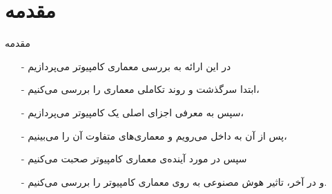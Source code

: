 \section{مقدمه}
\begin{frame}{مقدمه}
\begin{itemize}\itemr
\item[-]
در این ارائه به بررسی معماری کامپیوتر می‌پردازیم
\item[-]
ابتدا سرگذشت و روند تکاملی معماری را بررسی می‌کنیم،
\item[-]
سپس به معرفی اجزای اصلی یک کامپیوتر می‌پردازیم،
\item[-]
پس از آن به داخل  می‌رویم و معماری‌های متفاوت آن را می‌بینیم،
\item[-]
سپس در مورد آینده‌ی معماری کامپیوتر صحبت می‌کنیم
\item[-]
و در آخر، تاثیر هوش مصنوعی به روی معماری کامپیوتر را بررسی می‌کنیم.
\end{itemize}
\end{frame}